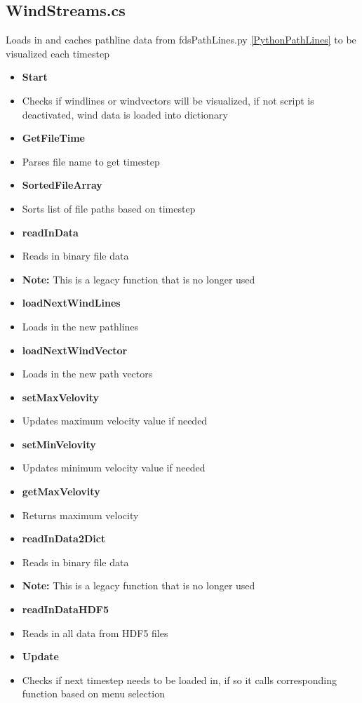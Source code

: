 \subsection{WindStreams.cs}
Loads in and caches pathline data from fdsPathLines.py \ref{PythonPathLines} to be visualized each timestep
\begin{itemize}
    \item \textbf{Start}
    \item[] Checks if windlines or windvectors will be visualized, if not script is deactivated, wind data is loaded into dictionary
    
    \item \textbf{GetFileTime}
    \item[] Parses file name to get timestep
    
    \item \textbf{SortedFileArray}
    \item[] Sorts list of file paths based on timestep
    
    \item \textbf{readInData}
    \item[] Reads in binary file data
    \item[] \textbf{Note:} This is a legacy function that is no longer used
    

    \item \textbf{loadNextWindLines}
    \item[] Loads in the new pathlines
    
    \item \textbf{loadNextWindVector}
    \item[] Loads in the new path vectors

    \item \textbf{setMaxVelovity}
    \item[] Updates maximum velocity value if needed
    
    \item \textbf{setMinVelovity}
    \item[] Updates minimum velocity value if needed
    
    \item \textbf{getMaxVelovity}
    \item[] Returns maximum velocity 

    \item \textbf{ readInData2Dict}
    \item[] Reads in binary file data
    \item[] \textbf{Note:} This is a legacy function that is no longer used
    

    \item \textbf{readInDataHDF5}
    \item[] Reads in all data from HDF5 files
    \item \textbf{Update}
    \item[] Checks if next timestep needs to be loaded in, if so it calls corresponding function based on menu selection 
\end{itemize}       